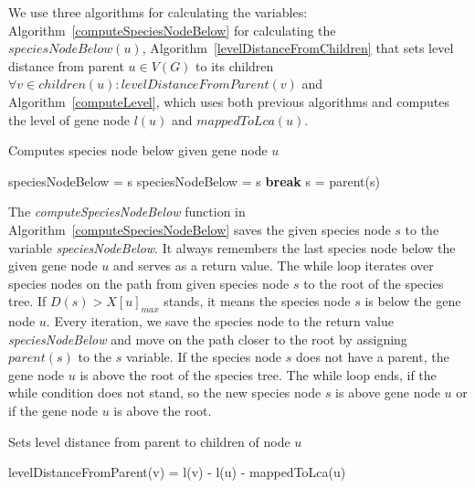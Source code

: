 We use three algorithms for calculating the variables: Algorithm~\ref{computeSpeciesNodeBelow} for calculating the $speciesNodeBelow(u)$, Algorithm~\ref{levelDistanceFromChildren} that sets level distance from parent $u \in V(G)$ to its children $\forall v \in children(u): levelDistanceFromParent(v)$ and Algorithm~\ref{computeLevel}, which uses both previous algorithms and computes the level of gene node $l(u)$ and $mappedToLca(u)$.

\begin{algorithm}
\caption{Computes species node below given gene node $u$} 
\label{computeSpeciesNodeBelow}
\begin{algorithmic}[1]
	\State speciesNodeBelow = s
		\State speciesNodeBelow = s
			\State \textbf{break}
		\Else
			\State s = parent(s)
		\EndIf
	\EndWhile
\EndFunction
\end{algorithmic}
\end{algorithm}

The \emph{computeSpeciesNodeBelow} function in Algorithm~\ref{computeSpeciesNodeBelow} saves the given species node $s$ to the variable \emph{speciesNodeBelow}. It always remembers the last species node below the given gene node $u$ and serves as a return value. The while loop iterates over species nodes on the path from given species node $s$ to the root of the species tree. If $D(s) > X[u]_{max}$ stands, it means the species node $s$ is below the gene node $u$. Every iteration, we save the species node to the return value \emph{speciesNodeBelow} and move on the path closer to the root by assigning $parent(s)$ to the $s$ variable. If the species node $s$ does not have a parent, the gene node $u$ is above the root of the species tree. The while loop ends, if the while condition does not stand, so the new species node $s$ is above gene node $u$ or if the gene node $u$ is above the root.

\begin{algorithm}
\caption{Sets level distance from parent to children of node $u$} 
\label{levelDistanceFromChildren}
\begin{algorithmic}[1]
		\State levelDistanceFromParent(v) = l(v) - l(u) - mappedToLca(u)
	\EndFor
\EndFunction
\end{algorithmic}
\end{algorithm}

